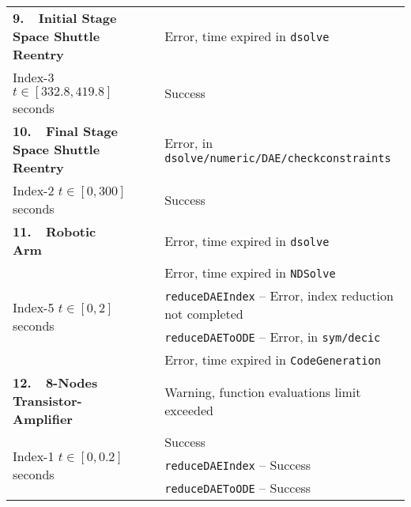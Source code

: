 {\begin{longtable}{lccl}
  \multirow{1}{*}{\textbf{9.~~Initial Stage Space Shuttle Reentry~\cite{brenan1995numerical}}}
    & \Maple{}  & \mycrossmark{}\phantom{\mywarnmark{}} & Error, time expired in \texttt{dsolve} \\ \cmidrule{2-4}
    Index-3 \quad $t \in [332.8, 419.8]$ seconds & \Indigo{} & \mycheckmark{}\phantom{\mywarnmark{}} & Success \\ \midrule
  \multirow{1}{*}{\textbf{10.~~Final Stage Space Shuttle Reentry~\cite{brenan1995numerical}}}
    & \Maple{}  & \mycrossmark{}\phantom{\mywarnmark{}} & Error, in \texttt{dsolve/numeric/DAE/checkconstraints} \\ \cmidrule{2-4}
    Index-2 \quad $t \in [0, 300]$ seconds & \Indigo{} & \mycheckmark{}\phantom{\mywarnmark{}} & Success \\ \midrule
  \multirow{1}{*}{\textbf{11.~~Robotic Arm~\cite{pryce1998solving}}}
    & \Maple{}       & \mycrossmark{}\phantom{\mywarnmark{}} & Error, time expired in \texttt{dsolve} \\ \cmidrule{2-4}
    \multirow{4}{*}{Index-5 \quad $t \in [0, 2]$ seconds}
    & \Mathematica{} & \mycrossmark{}\phantom{\mywarnmark{}} & Error, time expired in \texttt{NDSolve} \\ \cmidrule{2-4}
    & \multirow{2}{*}{\Matlab{}} & \mycrossmark{}\phantom{\mywarnmark{}} & \texttt{reduceDAEIndex} -- Error, index reduction not completed \\ \cmidrule{3-4}
    &                            & \mycrossmark{}\phantom{\mywarnmark{}} & \texttt{reduceDAEToODE} -- Error, in \texttt{sym/decic} \\ \cmidrule{2-4}
    & \Indigo{} & \mycrossmark{}\phantom{\mywarnmark{}} & Error, time expired in \texttt{CodeGeneration} \\ \midrule
  \multirow{1}{*}{\textbf{12.~~8-Nodes Transistor-Amplifier~\cite{lioen1998test, mazzia2008test}}}
    & \Maple{}       & \mycheckmark{}\mywarnmark{} & Warning, function evaluations limit exceeded \\ \cmidrule{2-4}
    \multirow{4}{*}{Index-1 \quad $t \in [0, 0.2]$ seconds} & \Mathematica{} & \mycheckmark{}\phantom{\mywarnmark{}} & Success \\ \cmidrule{2-4}
    & \multirow{2}{*}{\Matlab{}} & \mycheckmark{}\phantom{\mywarnmark{}} & \texttt{reduceDAEIndex} -- Success \\ \cmidrule{3-4}
    &                            & \mycheckmark{}\phantom{\mywarnmark{}} & \texttt{reduceDAEToODE} -- Success \\ \cmidrule{2-4}\cmidrule{2-4}

\end{longtable}}
